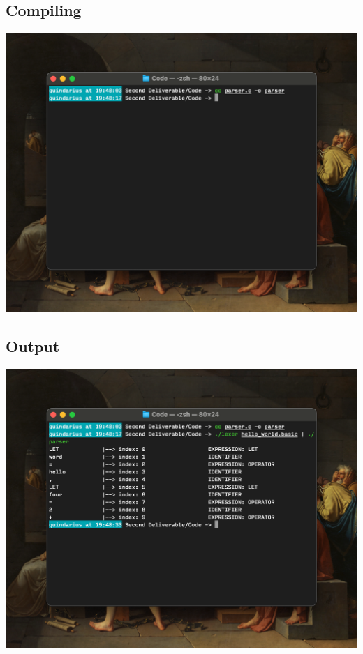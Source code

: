 \documentclass{report}
\begin{document}
\subsection*{Compiling}
\includegraphics[width =\textwidth]{compile.png}
\subsection*{Output}
\includegraphics[width =\textwidth]{parser.png}
\end{document}
